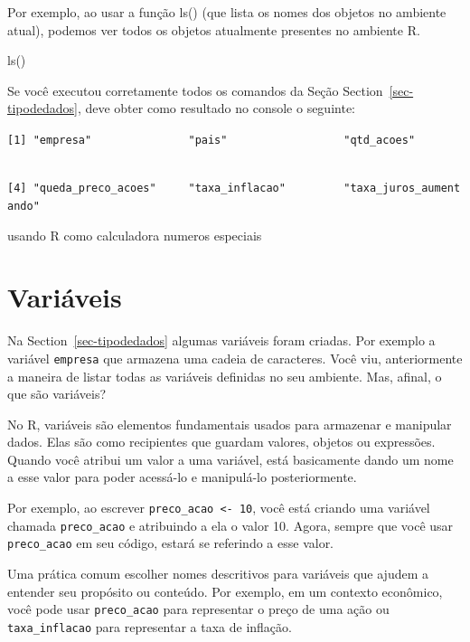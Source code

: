 \documentclass[
  letterpaper,
  DIV=11,
  numbers=noendperiod]{scrreprt}
\newenvironment{Shaded}{\begin{snugshade}}{\end{snugshade}}
\newcommand{\FunctionTok}[1]{\textcolor[rgb]{0.28,0.35,0.67}{#1}}
\newcommand{\NormalTok}[1]{\textcolor[rgb]{0.00,0.23,0.31}{#1}}
\begin{document}
Por exemplo, ao usar a função ls() (que lista os nomes dos objetos no
ambiente atual), podemos ver todos os objetos atualmente presentes no
ambiente R.

\begin{Shaded}
\begin{Highlighting}[]
\FunctionTok{ls}\NormalTok{()}
\end{Highlighting}
\end{Shaded}

Se você executou corretamente todos os comandos da Seção
Section~\ref{sec-tipodedados}, deve obter como resultado no console o
seguinte:

\texttt{{[}1{]}\ "empresa"\ \ \ \ \ \ \ \ \ \ \ \ \ \ \ "pais"\ \ \ \ \ \ \ \ \ \ \ \ \ \ \ \ \ \ "qtd\_acoes"}\strut \\
\texttt{{[}4{]}\ "queda\_preco\_acoes"\ \ \ \ \ "taxa\_inflacao"\ \ \ \ \ \ \ \ \ "taxa\_juros\_aumentando"}

usando R como calculadora numeros especiais

\hypertarget{variuxe1veis}{%
\section{Variáveis}\label{variuxe1veis}}

Na Section~\ref{sec-tipodedados} algumas variáveis foram criadas. Por
exemplo a variável \texttt{empresa} que armazena uma cadeia de
caracteres. Você viu, anteriormente a maneira de listar todas as
variáveis definidas no seu ambiente. Mas, afinal, o que são variáveis?

No R, variáveis são elementos fundamentais usados para armazenar e
manipular dados. Elas são como recipientes que guardam valores, objetos
ou expressões. Quando você atribui um valor a uma variável, está
basicamente dando um nome a esse valor para poder acessá-lo e
manipulá-lo posteriormente.

Por exemplo, ao escrever \texttt{preco\_acao\ \textless{}-\ 10}, você
está criando uma variável chamada \texttt{preco\_acao} e atribuindo a
ela o valor 10. Agora, sempre que você usar \texttt{preco\_acao} em seu
código, estará se referindo a esse valor.

Uma prática comum escolher nomes descritivos para variáveis que ajudem a
entender seu propósito ou conteúdo. Por exemplo, em um contexto
econômico, você pode usar \texttt{preco\_acao} para representar o preço
de uma ação ou \texttt{taxa\_inflacao} para representar a taxa de
inflação.
\end{document}
